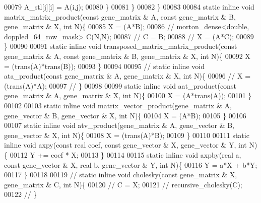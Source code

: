 \begin{DoxyCode}
00079         A\_stl[j][i] = A(i,j);
00080       \}
00081     \}
00082   \}
00083 
00084   \textcolor{keyword}{static} \textcolor{keyword}{inline} \textcolor{keywordtype}{void} matrix\_matrix\_product(\textcolor{keyword}{const} gene\_matrix & A, \textcolor{keyword}{const} gene\_matrix & B, gene\_matrix & X, \textcolor{keywordtype}{
      int} N)\{
00085     X = (A*B);
00086 \textcolor{comment}{//     morton\_dense<double, doppled\_64\_row\_mask> C(N,N);}
00087 \textcolor{comment}{//     C = B;}
00088 \textcolor{comment}{//     X = (A*C);}
00089   \}
00090 
00091   \textcolor{keyword}{static} \textcolor{keyword}{inline} \textcolor{keywordtype}{void} transposed\_matrix\_matrix\_product(\textcolor{keyword}{const} gene\_matrix & A, \textcolor{keyword}{const} gene\_matrix & B, 
      gene\_matrix & X, \textcolor{keywordtype}{int} N)\{
00092     X = (trans(A)*trans(B));
00093   \}
00094 
00095 \textcolor{comment}{//   static inline void ata\_product(const gene\_matrix & A, gene\_matrix & X, int N)\{}
00096 \textcolor{comment}{//     X = (trans(A)*A);}
00097 \textcolor{comment}{//   \}}
00098 
00099   \textcolor{keyword}{static} \textcolor{keyword}{inline} \textcolor{keywordtype}{void} aat\_product(\textcolor{keyword}{const} gene\_matrix & A, gene\_matrix & X, \textcolor{keywordtype}{int} N)\{
00100     X = (A*trans(A));
00101   \}
00102 
00103   \textcolor{keyword}{static} \textcolor{keyword}{inline} \textcolor{keywordtype}{void} matrix\_vector\_product(gene\_matrix & A, gene\_vector & B, gene\_vector & X, \textcolor{keywordtype}{int} N)\{
00104     X = (A*B);
00105   \}
00106 
00107   \textcolor{keyword}{static} \textcolor{keyword}{inline} \textcolor{keywordtype}{void} atv\_product(gene\_matrix & A, gene\_vector & B, gene\_vector & X, \textcolor{keywordtype}{int} N)\{
00108     X = (trans(A)*B);
00109   \}
00110 
00111   \textcolor{keyword}{static} \textcolor{keyword}{inline} \textcolor{keywordtype}{void} axpy(\textcolor{keyword}{const} real coef, \textcolor{keyword}{const} gene\_vector & X, gene\_vector & Y, \textcolor{keywordtype}{int} N)\{
00112     Y += coef * X;
00113   \}
00114 
00115   \textcolor{keyword}{static} \textcolor{keyword}{inline} \textcolor{keywordtype}{void} axpby(real a, \textcolor{keyword}{const} gene\_vector & X, real b, gene\_vector & Y, \textcolor{keywordtype}{int} N)\{
00116     Y = a*X + b*Y;
00117   \}
00118 
00119 \textcolor{comment}{//   static inline void cholesky(const gene\_matrix & X, gene\_matrix & C, int N)\{}
00120 \textcolor{comment}{//     C = X;}
00121 \textcolor{comment}{//     recursive\_cholesky(C);}
00122 \textcolor{comment}{//   \}}

\end{DoxyCode}
